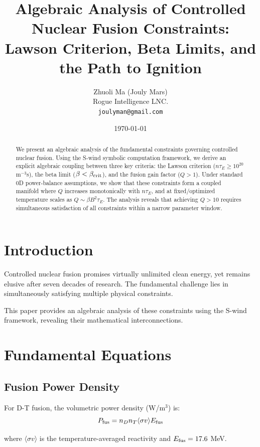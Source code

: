 \documentclass[11pt,a4paper]{article}
\title{Algebraic Analysis of Controlled Nuclear Fusion Constraints:\\
Lawson Criterion, Beta Limits, and the Path to Ignition}
\author{Zhuoli Ma (Jouly Mars)\\
\small Rogue Intelligence LNC.\\
\small \texttt{joulyman@gmail.com}}
\date{\today}
\begin{document}
\maketitle

\begin{abstract}
We present an algebraic analysis of the fundamental constraints governing 
controlled nuclear fusion. Using the S-wind symbolic computation framework, 
we derive an explicit algebraic coupling between three key criteria: the Lawson 
criterion ($n\tau_E \geq 10^{20}$ m$^{-3}$s), the beta limit 
($\beta < \beta_{\rm crit}$), and the fusion gain factor ($Q > 1$). 
Under standard 0D power-balance assumptions, we show that these constraints 
form a coupled manifold where $Q$ increases monotonically with $n\tau_E$, 
and at fixed/optimized temperature scales as $Q \sim \beta B^2 \tau_E$. 
The analysis reveals that achieving $Q > 10$ requires simultaneous 
satisfaction of all constraints within a narrow parameter window.
\end{abstract}

\section{Introduction}

Controlled nuclear fusion promises virtually unlimited clean energy, yet 
remains elusive after seven decades of research. The fundamental challenge 
lies in simultaneously satisfying multiple physical constraints.

This paper provides an algebraic analysis of these constraints using the 
S-wind framework, revealing their mathematical interconnections.

\section{Fundamental Equations}

\subsection{Fusion Power Density}

For D-T fusion, the volumetric power density (W/m$^3$) is:
\begin{equation}
P_{\rm fus} = n_D n_T \langle\sigma v\rangle E_{\rm fus}
\end{equation}

where $\langle\sigma v\rangle$ is the temperature-averaged reactivity and $E_{\rm fus} = 17.6$ MeV.
\end{document}
